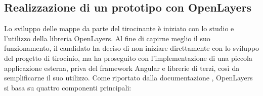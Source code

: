 


\subsection{Realizzazione di un prototipo con OpenLayers}

Lo sviluppo delle mappe da parte del tirocinante è iniziato con lo studio e l'utilizzo della libreria OpenLayers. Al fine di capirne meglio il suo funzionamento, il candidato ha deciso di non iniziare direttamente con lo sviluppo del progetto di tirocinio, ma ha proseguito con l'implementazione di una piccola applicazione esterna, priva del framework Angular e librerie di terzi, così da semplificarne il suo utilizzo. Come riportato dalla documentazione \cite{DocumentazioneOpenLayersBase}, OpenLayers si basa su quattro componenti principali:


